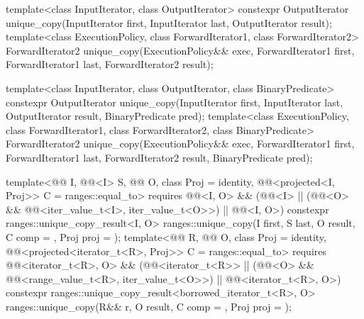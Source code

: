 %
\begin{itemdecl}
template<class InputIterator, class OutputIterator>
  constexpr OutputIterator
    unique_copy(InputIterator first, InputIterator last,
                OutputIterator result);
template<class ExecutionPolicy, class ForwardIterator1, class ForwardIterator2>
  ForwardIterator2
    unique_copy(ExecutionPolicy&& exec,
                ForwardIterator1 first, ForwardIterator1 last,
                ForwardIterator2 result);

template<class InputIterator, class OutputIterator,
         class BinaryPredicate>
  constexpr OutputIterator
    unique_copy(InputIterator first, InputIterator last,
                OutputIterator result, BinaryPredicate pred);
template<class ExecutionPolicy, class ForwardIterator1, class ForwardIterator2,
         class BinaryPredicate>
  ForwardIterator2
    unique_copy(ExecutionPolicy&& exec,
                ForwardIterator1 first, ForwardIterator1 last,
                ForwardIterator2 result, BinaryPredicate pred);

template<@@ I, @@<I> S, @@ O, class Proj = identity,
         @@<projected<I, Proj>> C = ranges::equal_to>
  requires @@<I, O> &&
           (@@<I> ||
            (@@<O> && @@<iter_value_t<I>, iter_value_t<O>>) ||
            @@<I, O>)
  constexpr ranges::unique_copy_result<I, O>
    ranges::unique_copy(I first, S last, O result, C comp = {}, Proj proj = {});
template<@@ R, @@ O, class Proj = identity,
         @@<projected<iterator_t<R>, Proj>> C = ranges::equal_to>
  requires @@<iterator_t<R>, O> &&
           (@@<iterator_t<R>> ||
            (@@<O> && @@<range_value_t<R>, iter_value_t<O>>) ||
            @@<iterator_t<R>, O>)
  constexpr ranges::unique_copy_result<borrowed_iterator_t<R>, O>
    ranges::unique_copy(R&& r, O result, C comp = {}, Proj proj = {});
\end{itemdecl}

